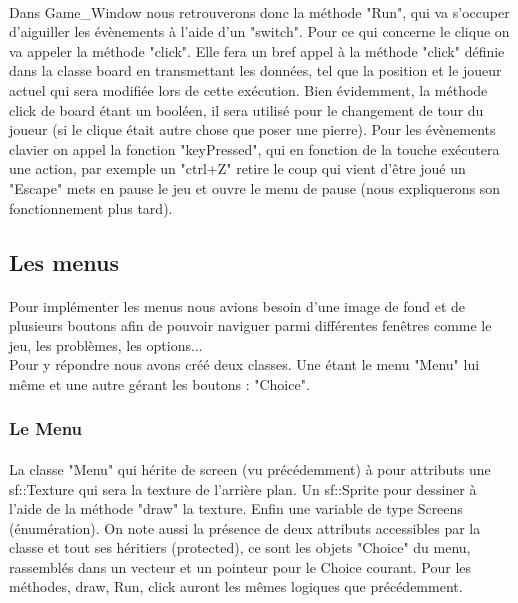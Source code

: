     	        \paragraph{}Dans Game\_Window nous retrouverons donc la méthode "Run", qui va s'occuper d'aiguiller les évènements à l'aide d'un "switch". Pour ce qui concerne le clique on va appeler la méthode "click". Elle fera un bref appel à la méthode "click" définie dans la classe board en transmettant les données, tel que la position et le joueur actuel qui sera modifiée lors de cette exécution. Bien évidemment, la méthode click de board étant un booléen, il sera utilisé pour le changement de tour du joueur (si le clique était autre chose que poser une pierre). Pour les évènements clavier on appel la fonction "keyPressed", qui en fonction de la touche exécutera une action, par exemple un "ctrl+Z" retire le coup qui vient d'être joué un "Escape" mets en pause le jeu et ouvre le menu de pause (nous expliquerons son fonctionnement plus tard).
        
        
        \subsection{Les menus}
            \paragraph{}Pour implémenter les menus nous avions besoin d'une image de fond et de plusieurs boutons afin de pouvoir naviguer parmi différentes fenêtres comme le jeu, les problèmes, les options...\\
            Pour y répondre nous avons créé deux classes. Une étant le menu "Menu" lui même et une autre gérant les boutons : "Choice".
            
            \subsubsection{Le Menu}
                \paragraph{}La classe "Menu" qui hérite de screen (vu précédemment) à pour attributs une sf::Texture qui sera la texture de l'arrière plan. Un sf::Sprite pour dessiner à l'aide de la méthode "draw" la texture. Enfin une variable de type Screens (énumération). On note aussi la présence de deux attributs accessibles par la classe et tout ses héritiers (protected), ce sont les objets "Choice" du menu, rassemblés dans un vecteur et un pointeur pour le Choice courant. Pour les méthodes, draw, Run, click auront les mêmes logiques que précédemment. 
                
